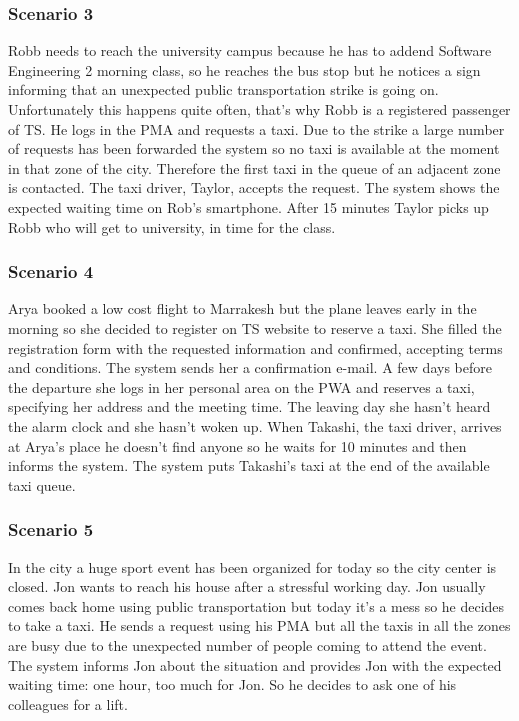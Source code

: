 \subsubsection{Scenario 3}

Robb needs to reach the university campus because he has to addend
Software Engineering 2 morning class, so he reaches the bus stop but
he notices a sign informing that an unexpected public transportation
strike is going on. Unfortunately this happens quite often, that's
why Robb is a registered passenger of TS. He logs in the PMA and requests
a taxi. Due to the strike a large number of requests has been forwarded
the system so no taxi is available at the moment in that zone of the
city. Therefore the first taxi in the queue of an adjacent zone is
contacted. The taxi driver, Taylor, accepts the request. The system
shows the expected waiting time on Rob's smartphone. After 15 minutes
Taylor picks up Robb who will get to university, in time for the class.


\subsubsection{Scenario 4}

Arya booked a low cost flight to Marrakesh but the plane leaves early
in the morning so she decided to register on TS website to reserve
a taxi. She filled the registration form with the requested information
and confirmed, accepting terms and conditions. The system sends her
a confirmation e-mail. A few days before the departure she logs in
her personal area on the PWA and reserves a taxi, specifying her address
and the meeting time. The leaving day she hasn't heard the alarm clock
and she hasn't woken up. When Takashi, the taxi driver, arrives at
Arya’s place he doesn’t find anyone so he waits for 10 minutes and
then informs the system. The system puts Takashi's taxi at the end
of the available taxi queue.


\subsubsection{Scenario 5}

In the city a huge sport event has been organized for today so the
city center is closed. Jon wants to reach his house after a stressful
working day. Jon usually comes back home using public transportation
but today it's a mess so he decides to take a taxi. He sends a request
using his PMA but all the taxis in all the zones are busy due to the
unexpected number of people coming to attend the event. The system
informs Jon about the situation and provides Jon with the expected
waiting time: one hour, too much for Jon. So he decides to ask one
of his colleagues for a lift.



